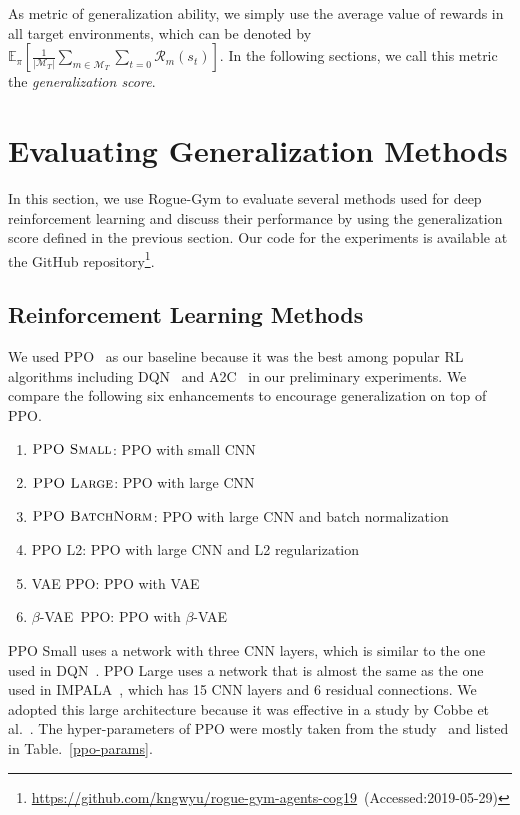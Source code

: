 \documentclass[conference]{IEEEtran}
\newcommand\cobbe{Cobbe et al.~\cite{Coinrun}}
\newcommand\ppos{$\textsc{PPO Small}$}
\newcommand\ppol{$\textsc{PPO Large}$}
\newcommand\ppob{$\textsc{PPO BatchNorm}$}
\newcommand\bvae{$\beta$-VAE}
\newcommand\bppo{\bvae~PPO}
\newcommand\footurl[1]{\footnote{\url{#1}~(Accessed:2019-05-29)}}
\begin{document}
As metric of generalization ability, we simply use the average value of
rewards in all target environments, which can be denoted by
$\mathbb{E}_{\pi}\left[\frac{1}{|\mathcal{M}_T|} \sum_{m\in \mathcal{M}_T} \sum_{t=0}
\mathcal{R}_m(s_t) \right]$.
In the following sections, we call this metric the
\textit{generalization score}.

\section{Evaluating Generalization Methods}\label{section:experiments}
In this section, we use Rogue-Gym to evaluate several methods used for
deep reinforcement learning and discuss their performance by using the
generalization score defined in the previous section.
Our code for the experiments is available at the GitHub
repository\footurl{https://github.com/kngwyu/rogue-gym-agents-cog19}.

\subsection{Reinforcement Learning Methods}
We used PPO~\cite{PPO} as our baseline because it was the best among
popular RL algorithms including DQN~\cite{DQN} and
A2C~\cite{MnihBMGLHSK16,ACKTR} in our preliminary experiments.
We compare the following six enhancements to encourage generalization on
top of PPO.
\begin{enumerate}
 \item \ppos{}: PPO with small CNN
 \item \ppol{}: PPO with large CNN
 \item \ppob{}: PPO with large CNN and batch normalization
 \item PPO L2: PPO with large CNN and L2 regularization
 \item VAE PPO: PPO with VAE
 \item \bppo{}: PPO with \bvae{}
\end{enumerate}
PPO Small uses a network with three CNN layers, which is similar to the
one used in DQN~\cite{DQN}.
PPO Large uses a network that is almost the same as the one used in
IMPALA~\cite{IMPALA}, which has 15 CNN layers and 6 residual
connections.
We adopted this large architecture because it was effective in a study by
\cobbe{}.
The hyper-parameters of PPO were mostly taken from the study~\cite{PPO}
and listed in Table.~\ref{ppo-params}.
\end{document}
